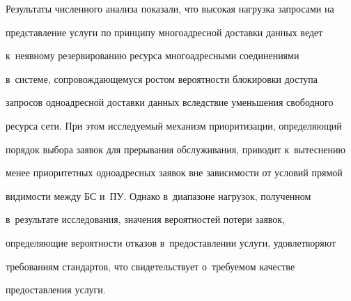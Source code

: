   Результаты численного анализа показали, что высокая на\-груз\-ка запросами на 

представ\-ле\-ние услуги по принципу многоадресной доставки данных ведет 

к~неявному резервированию ресурса многоадресными соединениями  

в~сис\-те\-ме, со\-про\-вож\-да\-юще\-му\-ся рос\-том ве\-ро\-ят\-ности блокировки доступа 

запросов одноадресной доставки данных вследствие уменьшения свободного 

ресурса сети. При этом исследуемый механизм приоритизации, опре\-де\-ля\-ющий 

порядок выбора заявок для прерывания обслуживания, приводит к~вытеснению 

менее приоритетных одноадресных заявок вне за\-ви\-си\-мости от условий прямой 

ви\-ди\-мости меж\-ду БС и~ПУ. Однако в~диапазоне нагрузок, полученном 

в~результате исследования, значения вероятностей потери заявок, 

опре\-де\-ля\-ющие вероятности отказов в~предостав\-ле\-нии услуги, удовле\-тво\-ря\-ют 

требованиям стандартов, что свидетельствует о~тре\-бу\-емом качестве 

предостав\-ле\-ния услуги.





